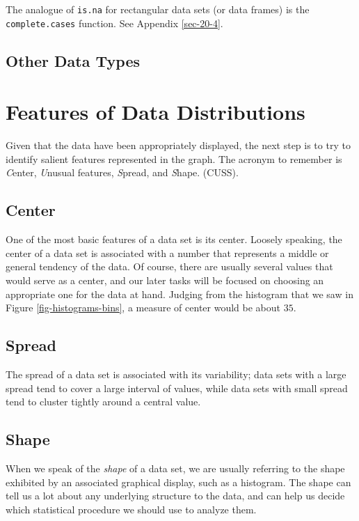 \documentclass[captions=tableheading]{scrbook}
\begin{document}
The analogue of \texttt{is.na} for rectangular data sets (or data frames) is the \texttt{complete.cases} function. See Appendix \ref{sec-20-4}.
\subsection{Other Data Types}
\label{sec-3-1-7}
\label{sub-other-data-types}
\section{Features of Data Distributions}
\label{sec-3-2}
\label{sec-features-of-data}


Given that the data have been appropriately displayed, the next step is to try to identify salient features represented in the graph. The acronym to remember is \emph{C}enter, \emph{U}nusual features, \emph{S}pread, and \emph{S}hape. (CUSS).
\subsection{Center}
\label{sec-3-2-1}
\label{sub-Center}


One of the most basic features of a data set is its center. Loosely speaking, the center of a data set is associated with a number that represents a middle or general tendency of the data. Of course, there are usually several values that would serve as a center, and our later tasks will be focused on choosing an appropriate one for the data at hand. Judging from the histogram that we saw in Figure \ref{fig-histograms-bins}, a measure of center would be about \(  35 \). 
\subsection{Spread}
\label{sec-3-2-2}
\label{sub-Spread}


The spread of a data set is associated with its variability; data sets with a large spread tend to cover a large interval of values, while data sets with small spread tend to cluster tightly around a central value. 
\subsection{Shape}
\label{sec-3-2-3}
\label{sub-Shape}


When we speak of the \emph{shape} of a data set, we are usually referring to the shape exhibited by an associated graphical display, such as a histogram. The shape can tell us a lot about any underlying structure to the data, and can help us decide which statistical procedure we should use to analyze them.
\end{document}

